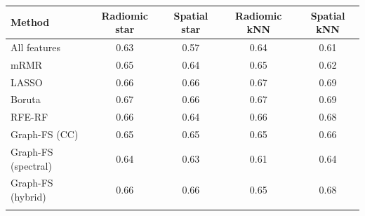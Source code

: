 \begin{tabular}{@{}lcccc@{}}
\toprule
Method & Radiomic star & Spatial star & Radiomic kNN & Spatial kNN \\
\midrule
All features & 0.63 & 0.57 & 0.64 & 0.61 \\
mRMR & 0.65 & 0.64 & 0.65 & 0.62 \\
LASSO & 0.66 & 0.66 & 0.67 & 0.69 \\
Boruta & 0.67 & 0.66 & 0.67 & 0.69 \\
RFE-RF & 0.66 & 0.64 & 0.66 & 0.68 \\
Graph-FS (CC) & 0.65 & 0.65 & 0.65 & 0.66 \\
Graph-FS (spectral) & 0.64 & 0.63 & 0.61 & 0.64 \\
Graph-FS (hybrid) & 0.66 & 0.66 & 0.65 & 0.68 \\
\botrule
\end{tabular}
